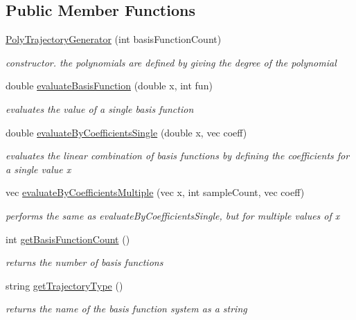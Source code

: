 \subsection*{\-Public \-Member \-Functions}
\begin{DoxyCompactItemize}
\item 
\hyperlink{classPolyTrajectoryGenerator_ae1510d843f50e8e53583d8f5433b16bf}{\-Poly\-Trajectory\-Generator} (int basis\-Function\-Count)
\begin{DoxyCompactList}\small\item\em constructor. the polynomials are defined by giving the degree of the polynomial \end{DoxyCompactList}\item 
double \hyperlink{classPolyTrajectoryGenerator_ade2a3a1dee55b16e56b83ba82f4740db}{evaluate\-Basis\-Function} (double x, int fun)
\begin{DoxyCompactList}\small\item\em evaluates the value of a single basis function \end{DoxyCompactList}\item 
double \hyperlink{classPolyTrajectoryGenerator_ae5b2dbcbd8d3c061cf78a4a48739bfc2}{evaluate\-By\-Coefficients\-Single} (double x, vec coeff)
\begin{DoxyCompactList}\small\item\em evaluates the linear combination of basis functions by defining the coefficients for a single value x \end{DoxyCompactList}\item 
vec \hyperlink{classPolyTrajectoryGenerator_a793a3759c070ae062e21bdc9dd6dc5e9}{evaluate\-By\-Coefficients\-Multiple} (vec x, int sample\-Count, vec coeff)
\begin{DoxyCompactList}\small\item\em performs the same as evaluate\-By\-Coefficients\-Single, but for multiple values of x \end{DoxyCompactList}\item 
int \hyperlink{classPolyTrajectoryGenerator_aaa3de7ffa14a1972dd43136e0ffd96c1}{get\-Basis\-Function\-Count} ()
\begin{DoxyCompactList}\small\item\em returns the number of basis functions \end{DoxyCompactList}\item 
string \hyperlink{classPolyTrajectoryGenerator_afbad1b2268151069d1279ecf734cccb1}{get\-Trajectory\-Type} ()
\begin{DoxyCompactList}\small\item\em returns the name of the basis function system as a string \end{DoxyCompactList}\end{DoxyCompactItemize}


